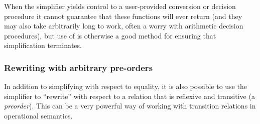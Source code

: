 When the simplifier yields control to a user-provided conversion or
decision procedure it cannot guarantee that these functions will ever
return (and they may also take arbitrarily long to work, often a worry
with arithmetic decision procedures), but use of  is
otherwise a good method for ensuring that simplification terminates.

\subsubsection{Rewriting with arbitrary pre-orders}
\label{sec:preorder-rewriting}

In addition to simplifying with respect to equality, it is also
possible to use the simplifier to ``rewrite'' with respect to a relation
that is reflexive and transitive (a \emph{preorder}).  This can be a
very powerful way of working with transition relations in operational
semantics.

